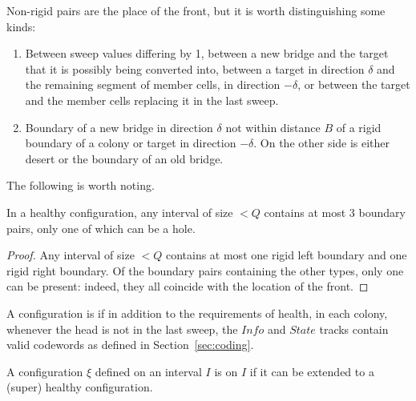 \documentclass[12pt]{memoir}
\newcommand{\authnote}[3]
{\text{{ \textcolor{#3}{\( \langle\hspace{-0.2em}\langle \)\textsf{\footnotesize #1: #2}\( \rangle\hspace{-0.2em}\rangle \)}}}}
\newcommand{\authnote}[2]{}
\newcommand{\Pnote}[1]{{\authnote{Peter}{#1}{cyan}}}
\newcommand{\Inote}[1]{{\authnote{Ilir}{#1}{blue}}}
\newcommand{\fld}[1]{\ensuremath{\textit{#1}}}
\def\B{B}
\newcommand{\Info}{\fld{Info}}
\newcommand{\State}{\fld{State}}
\begin{document}
Non-rigid pairs are the place of the front, but it is 
worth distinguishing some kinds:

\begin{enumerate}[(nr1)]
  \item\label{i:nonrigid.sweep} Between sweep values differing by 1,
between a new bridge and the target that it is possibly being converted into,
between a target in direction \( \delta \) and 
the remaining segment of member cells, in direction \( -\delta \),
or between the target and the member cells replacing it in the last sweep.

  \item\label{i:nonrigid.bridge-bridge} Boundary of a new bridge in direction \( \delta \)
not within distance \( \B \) of a rigid boundary of a colony or target in direction \( -\delta \).
On the other side is either desert or the boundary of an old bridge.

\end{enumerate}

The following is worth noting.

\begin{lemma}
In a healthy configuration, any interval of size \( <Q \) contains at most 3 boundary pairs,
only one of which can be  a hole.
\end{lemma}
\begin{proof}
Any interval of size \( <Q \) contains at most one rigid left boundary and
one rigid right boundary.
Of the boundary pairs containing the other
types, only one can be present: indeed, they all coincide with the location of the front.
\end{proof}

 \begin{definition}\label{def:super-healthy}
A configuration is   if in addition to the requirements of health, in each colony,
whenever the head is not in the last sweep,
the \( \Info \) and \( \State \) tracks contain valid codewords as
defined in Section~\ref{sec:coding}.

A configuration \( \xi \) defined on an interval \( I \) is  on \( I \) if 
it can be extended to a (super) healthy configuration.
 \end{definition}

\end{document}
